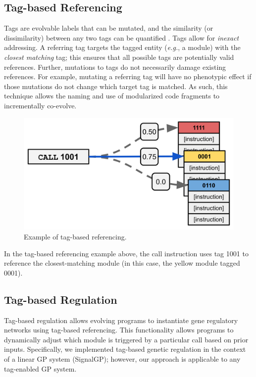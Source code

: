 \documentclass[
]{book}
\begin{document}
\hypertarget{tag-based-referencing}{%
\subsection{Tag-based Referencing}\label{tag-based-referencing}}

Tags are evolvable labels that can be mutated, and the similarity (or dissimilarity) between any two tags can be quantified \citep{spector_tag-based_2011}.
Tags allow for \emph{inexact} addressing.
A referring tag targets the tagged entity (\emph{e.g.}, a module) with the \emph{closest matching} tag;
this ensures that all possible tags are potentially valid references.
Further, mutations to tags do not necessarily damage existing references.
For example, mutating a referring tag will have no phenotypic effect if those mutations do not change which target tag is matched.
As such, this technique allows the naming and use of modularized code fragments to incrementally co-evolve.

\begin{figure}
\centering
\includegraphics{./media/tag-based-referencing.png}
\caption{Example of tag-based referencing.}
\end{figure}

In the tag-based referencing example above, the call instruction uses tag 1001 to reference the closest-matching module (in this case, the yellow module tagged 0001).

\hypertarget{tag-based-regulation}{%
\subsection{Tag-based Regulation}\label{tag-based-regulation}}

Tag-based regulation allows evolving programs to instantiate gene regulatory networks using tag-based referencing.
This functionality allows programs to dynamically adjust which module is triggered by a particular call based on prior inputs.
Specifically, we implemented tag-based genetic regulation in the context of a linear GP system (SignalGP); however, our approach is applicable to any tag-enabled GP system.
\end{document}
